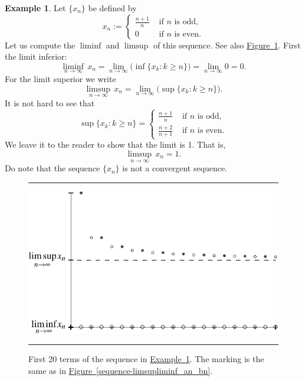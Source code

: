 \documentclass[12pt]{book}
\newenvironment{myfigureht}{%
\begin{figure}[h!t]
\noindent\rule{\textwidth}{0.4pt}\vspace{12pt}\par\centering}%
{\par\noindent\rule{\textwidth}{0.4pt}
\end{figure}}
\theoremstyle{plain}
\theoremstyle{remark}
\theoremstyle{definition}
\theoremstyle{exercise}
\theoremstyle{example}
\newtheorem{example}[thm]{Example}
\newcommand{\figureref}[1]{\hyperref[#1]{Figure~\ref*{#1}}}
\newcommand{\exampleref}[1]{\hyperref[#1]{Example~\ref*{#1}}}
\begin{document}
\begin{example} \label{example:liminfsupex}
Let $\{ x_n \}$ be defined by
\begin{equation*}
x_n :=
\begin{cases}
\frac{n+1}{n} & \text{ if $n$ is odd,} \\
0 & \text{ if $n$ is even.}
\end{cases}
\end{equation*}
Let us compute the $\liminf$ and $\limsup$ of this sequence.  See also
\figureref{sequence-limsupliminf_an_bn-example}.  First the
limit inferior:
\begin{equation*}
\liminf_{n\to\infty} \, x_n = 
\lim_{n\to\infty}
\bigl(
\inf \{ x_k : k \geq n \}
\bigr)
=
\lim_{n\to\infty} 0 = 0 .
\end{equation*}
For the limit superior we write
\begin{equation*}
\limsup_{n\to\infty} \, x_n = 
\lim_{n\to\infty}
\bigl(
\sup \{ x_k : k \geq n \}
\bigr) .
\end{equation*}
It is not hard to see that
\begin{equation*}
\sup \{ x_k : k \geq n \} =
\begin{cases}
\frac{n+1}{n} & \text{ if $n$ is odd,} \\
\frac{n+2}{n+1} & \text{ if $n$ is even.}
\end{cases}
\end{equation*}
We leave it to the reader to show that the limit is 1.  That is,
\begin{equation*}
\limsup_{n\to\infty} \, x_n = 1 .
\end{equation*}
Do note that the sequence $\{ x_n \}$ is not a convergent sequence.
\begin{myfigureht}
\includegraphics{figures/sequence-limsupliminf_an_bn-example}
\caption{First 20 terms of the sequence in \exampleref{example:liminfsupex}.
The marking is the same as in \figureref{sequence-limsupliminf_an_bn}.
\label{sequence-limsupliminf_an_bn-example}}
\end{myfigureht}
\end{example}
\end{document}
